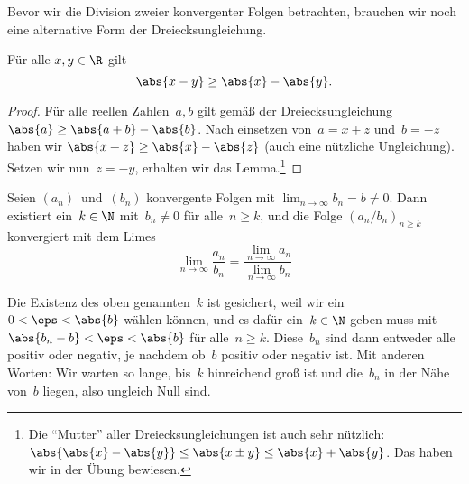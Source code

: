 \documentclass[a4paper]{article}
\begin{document}
Bevor wir die Division zweier konvergenter Folgen betrachten, brauchen wir noch eine alternative Form der Dreiecksungleichung.

\begin{lemma}\label{lem:reversetriangleineq}
    Für alle $x, y \in \R$ gilt
    \begin{equation*}
        \abs{x - y} \geq \abs{x} - \abs{y}.
    \end{equation*}
\end{lemma}

\begin{proof}
    Für alle reellen Zahlen~$a, b$ gilt gemäß der Dreiecksungleichung $\abs{a} \geq \abs{a+b} - \abs{b}$. Nach einsetzen von~$a = x+z$ und~$b = -z$ haben wir $\abs{x+z} \geq \abs{x} - \abs{z}$ (auch eine nützliche Ungleichung). Setzen wir nun~$z = -y$, erhalten wir das Lemma.\footnote{Die "`Mutter"' aller Dreiecksungleichungen ist auch sehr nützlich: $\abs{\abs{x} - \abs{y}} \leq \abs{x \pm y} \leq \abs{x} + \abs{y}$. Das haben wir in der Übung bewiesen.}
\end{proof}

\begin{theorem}
    Seien $(a_n)$~und~$(b_n)$ konvergente Folgen mit $\lim_{n\to\infty} b_n = b \neq 0$. Dann existiert ein~$k \in \N$ mit~$b_n \neq 0$ für alle~$n \geq k$, und die Folge $(a_n/b_n)_{n \geq k}$ konvergiert mit dem Limes
    \begin{equation*}
        \lim_{n\to\infty} \frac{a_n}{b_n} = \frac{\lim_{n\to\infty} a_n}{\lim_{n\to\infty} b_n}
    \end{equation*}
\end{theorem}

\begin{remark}
    Die Existenz des oben genannten~$k$ ist gesichert, weil wir ein~$0 < \eps < \abs{b}$ wählen können, und es dafür ein~$k \in \N$ geben muss mit $\abs{b_n - b} < \eps < \abs{b}$ für alle~$n \geq k$. Diese~$b_n$ sind dann entweder alle positiv oder negativ, je nachdem ob~$b$ positiv oder negativ ist. Mit anderen Worten: Wir warten so lange, bis~$k$ hinreichend groß ist und die~$b_n$ in der Nähe von~$b$ liegen, also ungleich Null sind.
\end{remark}
\end{document}
